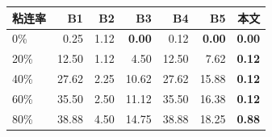 \setlength{\tabcolsep}{12pt}
\begin{tabular}{lrrrrrr}
\toprule
粘连率 & B1 & B2 & B3 & B4 & B5 & \textbf{本文} \\
\midrule
0\% & 0.25 & 1.12 & \textbf{0.00} & 0.12 & \textbf{0.00} & \textbf{0.00} \\
20\% & 12.50 & 1.12 & 4.50 & 12.50 & 7.62 & \textbf{0.12} \\
40\% & 27.62 & 2.25 & 10.62 & 27.62 & 15.88 & \textbf{0.12} \\
60\% & 35.50 & 2.50 & 11.12 & 35.50 & 16.38 & \textbf{0.12} \\
80\% & 38.88 & 4.50 & 14.75 & 38.88 & 18.25 & \textbf{0.88} \\
\bottomrule
\end{tabular}